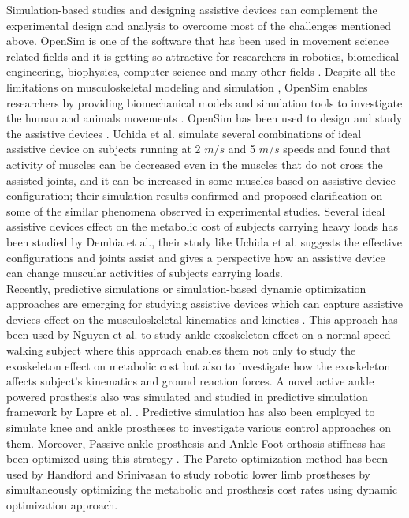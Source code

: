 \documentclass[10pt,letterpaper]{article}
\begin{document}
Simulation-based studies and designing assistive devices can complement the experimental design and analysis to overcome most of the challenges mentioned above. OpenSim is one of the software that has been used in movement science related fields\cite{89} and it is getting so attractive for researchers in robotics, biomedical engineering, biophysics, computer science and many other fields \cite{89,103}. Despite all the limitations on musculoskeletal modeling and simulation \cite{92}, OpenSim enables researchers by providing biomechanical models and simulation tools to investigate the human and animals movements \cite{89,103}. OpenSim has been used to design and study the assistive devices \cite{2,93,94,96}. Uchida et al. \cite{2} simulate several combinations of ideal assistive device on subjects running at 2 $m/s$ and 5 $m/s$ speeds and found that activity of muscles can be decreased even in the muscles that do not cross the assisted joints, and it can be increased in some muscles based on assistive device configuration; their simulation results confirmed and proposed clarification on some of the similar phenomena observed in experimental studies. Several ideal assistive devices effect on the metabolic cost of subjects carrying heavy loads has been studied by Dembia et al.\cite{93}, their study like Uchida et al. \cite{2} suggests the effective configurations and joints assist and gives a perspective how an assistive device can change muscular activities of subjects carrying loads.\\
Recently, predictive simulations or simulation-based dynamic optimization approaches are emerging for studying assistive devices which can capture assistive devices effect on the musculoskeletal kinematics and kinetics \cite{112}. This approach has been used by Nguyen et al. \cite{124} to study ankle exoskeleton effect on a normal speed walking subject where this approach enables them not only to study the exoskeleton effect on metabolic cost but also to investigate how the exoskeleton affects subject's kinematics and ground reaction forces. A novel active ankle powered prosthesis also was simulated and studied in predictive simulation framework by Lapre et al. \cite{125}. Predictive simulation has also been employed to simulate knee \cite{126} and ankle prostheses to investigate various control approaches on them\cite{111,127}. Moreover, Passive ankle prosthesis and Ankle-Foot orthosis stiffness has been optimized using this strategy \cite{128,129}. The Pareto optimization method has been used by Handford and Srinivasan\cite{111,127} to study robotic lower limb prostheses by simultaneously optimizing the metabolic and prosthesis cost rates using dynamic optimization approach. \\
\end{document}
